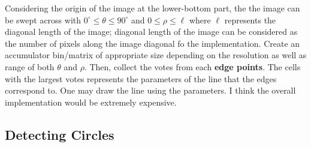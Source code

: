 \documentclass{report}
\begin{document}
%	
%	

Considering the origin of the image at the lower-bottom part, the the image can be swept across with $0^{\circ} \leq \theta \leq 90^{\circ}$ and $0 \leq \rho \leq \ell$ where $\ell$ represents the diagonal length of the image; diagonal length of the image can be considered as the number of pixels along the image diagonal fo the implementation. Create an accumulator bin/matrix of appropriate size depending on the resolution as well as range of both $\theta$ and $\rho$. Then, collect the votes from each \textbf{edge points}. The cells with the largest votes represents the parameters of the line that the edges correspond to. One may draw the line using the parameters. I think the overall implementation would be extremely expensive.



\subsection{Detecting Circles}



\end{document}
